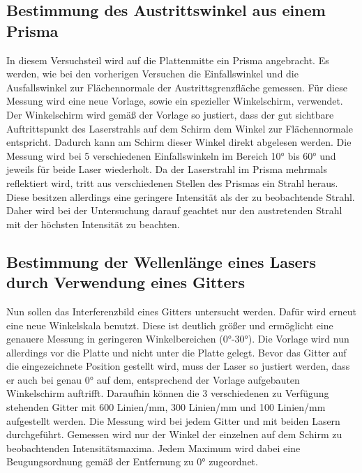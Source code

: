 \subsection{Bestimmung des Austrittswinkel aus einem Prisma}
In diesem Versuchsteil wird auf die Plattenmitte ein Prisma angebracht. Es werden, wie bei den vorherigen
Versuchen die Einfallswinkel und die Ausfallswinkel zur Flächennormale der Austrittsgrenzfläche gemessen. Für diese Messung
wird eine neue Vorlage, sowie ein spezieller Winkelschirm, verwendet. Der Winkelschirm wird gemäß der Vorlage so
justiert, dass der gut sichtbare Auftrittspunkt des Laserstrahls auf dem Schirm dem Winkel zur Flächennormale entspricht.
Dadurch kann am Schirm dieser Winkel direkt abgelesen werden. Die Messung wird bei 5 verschiedenen 
Einfallswinkeln im Bereich 10° bis 60° und jeweils für beide Laser wiederholt. Da der Laserstrahl im Prisma mehrmals
reflektiert wird, tritt aus verschiedenen Stellen des Prismas ein Strahl heraus. Diese besitzen allerdings eine geringere Intensität
als der zu beobachtende Strahl. Daher wird bei der Untersuchung darauf geachtet nur den austretenden Strahl mit der höchsten
Intensität zu beachten.
\subsection{Bestimmung der Wellenlänge eines Lasers durch Verwendung eines Gitters}
Nun sollen das Interferenzbild eines Gitters untersucht werden. Dafür wird erneut eine neue Winkelskala benutzt.
Diese ist deutlich größer und ermöglicht eine genauere Messung in geringeren Winkelbereichen (0°-30°).
Die Vorlage wird nun allerdings vor die Platte und nicht unter die Platte gelegt. Bevor das Gitter auf die 
eingezeichnete Position gestellt wird, muss der Laser so justiert werden, dass er auch bei genau 0° auf dem, entsprechend der
Vorlage aufgebauten Winkelschirm auftrifft. Daraufhin können die 3 verschiedenen zu Verfügung stehenden Gitter mit
600 Linien/mm, 300 Linien/mm und 100 Linien/mm aufgestellt werden. Die Messung wird bei jedem Gitter und mit beiden Lasern durchgeführt.
Gemessen wird nur der Winkel der einzelnen auf dem Schirm zu beobachtenden Intensitätsmaxima. Jedem Maximum wird
dabei eine Beugungsordnung gemäß der Entfernung zu 0° zugeordnet.
